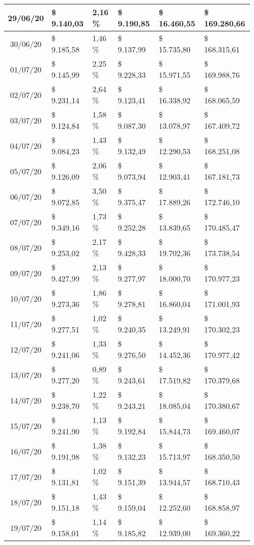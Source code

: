 \begin{small}
\begin{longtable}{|c|l|l|l|l|l|}
29/06/20 & \$ 9.140,03 & 2,16 \% & \$ 9.190,85 & \$ 16.460,55 & \$ 169.280,66 \\ \hline
30/06/20 & \$ 9.185,58 & 1,46 \% & \$ 9.137,99 & \$ 15.735,80 & \$ 168.315,61 \\ \hline
01/07/20 & \$ 9.145,99 & 2,25 \% & \$ 9.228,33 & \$ 15.971,55 & \$ 169.988,76 \\ \hline
02/07/20 & \$ 9.231,14 & 2,64 \% & \$ 9.123,41 & \$ 16.338,92 & \$ 168.065,59 \\ \hline
03/07/20 & \$ 9.124,84 & 1,58 \% & \$ 9.087,30 & \$ 13.078,97 & \$ 167.409,72 \\ \hline
04/07/20 & \$ 9.084,23 & 1,43 \% & \$ 9.132,49 & \$ 12.290,53 & \$ 168.251,08 \\ \hline
05/07/20 & \$ 9.126,09 & 2,06 \% & \$ 9.073,94 & \$ 12.903,41 & \$ 167.181,73 \\ \hline
06/07/20 & \$ 9.072,85 & 3,50 \% & \$ 9.375,47 & \$ 17.889,26 & \$ 172.746,10 \\ \hline
07/07/20 & \$ 9.349,16 & 1,73 \% & \$ 9.252,28 & \$ 13.839,65 & \$ 170.485,47 \\ \hline
08/07/20 & \$ 9.253,02 & 2,17 \% & \$ 9.428,33 & \$ 19.702,36 & \$ 173.738,54 \\ \hline
09/07/20 & \$ 9.427,99 & 2,13 \% & \$ 9.277,97 & \$ 18.000,70 & \$ 170.977,23 \\ \hline
10/07/20 & \$ 9.273,36 & 1,86 \% & \$ 9.278,81 & \$ 16.860,04 & \$ 171.001,93 \\ \hline
11/07/20 & \$ 9.277,51 & 1,02 \% & \$ 9.240,35 & \$ 13.249,91 & \$ 170.302,23 \\ \hline
12/07/20 & \$ 9.241,06 & 1,33 \% & \$ 9.276,50 & \$ 14.452,36 & \$ 170.977,42 \\ \hline
13/07/20 & \$ 9.277,20 & 0,89 \% & \$ 9.243,61 & \$ 17.519,82 & \$ 170.379,68 \\ \hline
14/07/20 & \$ 9.238,70 & 1,22 \% & \$ 9.243,21 & \$ 18.085,04 & \$ 170.380,67 \\ \hline
15/07/20 & \$ 9.241,90 & 1,13 \% & \$ 9.192,84 & \$ 15.844,73 & \$ 169.460,07 \\ \hline
16/07/20 & \$ 9.191,98 & 1,38 \% & \$ 9.132,23 & \$ 15.713,97 & \$ 168.350,50 \\ \hline
17/07/20 & \$ 9.131,81 & 1,02 \% & \$ 9.151,39 & \$ 13.944,57 & \$ 168.710,43 \\ \hline
18/07/20 & \$ 9.151,18 & 1,43 \% & \$ 9.159,04 & \$ 12.252,60 & \$ 168.858,97 \\ \hline
19/07/20 & \$ 9.158,01 & 1,14 \% & \$ 9.185,82 & \$ 12.939,00 & \$ 169.360,22 \\ \hline

\end{longtable}
\end{small}
